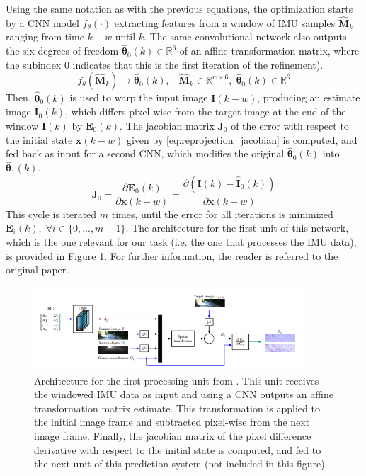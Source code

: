 Using the same notation as with the previous equations, the optimization starts by a CNN model $f_\theta(\cdot)$ extracting features from a window of IMU samples $\mathbf{\hat{M}}_k$ ranging from time $k-w$ until $k$. 
The same convolutional network also outputs the six degrees of freedom $\hat{\boldsymbol{\theta}}_0(k)\!\in\mathbb{R}^6$ of an affine transformation matrix, where the subindex $0$ indicates that this is the first iteration of the refinement).
\begin{equation}
    f_\theta\left(\mathbf{\hat{M}}_{k}\right) \rightarrow \hat{\boldsymbol{\theta}}_0(k), \;\;\; \mathbf{\hat{M}}_{k}\in\mathbb{R}^{w\times6}, \;\hat{\boldsymbol{\theta}}_0(k)\in\mathbb{R}^6
\end{equation}
Then, $\hat{\boldsymbol{\theta}}_0(k)$ is used to warp the input image $\mathbf{I}(k-w)$, producing an estimate image $\mathbf{\hat{I}}_0(k)$, which differs pixel-wise from the target image at the end of the window $\mathbf{I}(k)$ by $\mathbf{E}_0(k)$.
The jacobian matrix $\mathbf{J}_0$ of the error with respect to the initial state $\mathbf{x}(k-w)$ given by \ref{eq:reprojection_jacobian} is computed, and fed back as input for a second CNN, which modifies the original $\hat{\boldsymbol{\theta}}_0(k)$ into $\hat{\boldsymbol{\theta}}_1(k)$.
\begin{equation}\label{eq:reprojection_jacobian}
    \mathbf{J}_0 = \frac{\partial \mathbf{E}_0(k)}{\partial \mathbf{x}(k-w)}=\frac{\partial\!\left( \mathbf{I}(k)-\mathbf{\hat{I}}_0(k)\right)}{\partial \mathbf{x}(k-w)}
\end{equation}
This cycle is iterated $m$ times, until the error for all iterations is minimized $\mathbf{E}_i(k), \;\forall i\in\{0,...,m-1\}$.
The architecture for the first unit of this network, which is the one relevant for our task (i.e. the one that processes the IMU data), is provided in Figure \ref{fig:first_unit_unsupervised_vio}.
For further information, the reader is referred to the original paper. 

\begin{figure}[h]
   \centering
   \includegraphics[width=0.90\textwidth]{thesis_template/img/unsupervised_VIO.png}
   \caption{Architecture for the first processing unit from \cite{DBLP:journals/corr/abs-1803-05850}. This unit receives the windowed IMU data as input and using a CNN outputs an affine transformation matrix estimate. 
   This transformation is applied to the initial image frame and subtracted pixel-wise from the next image frame.
   Finally, the jacobian matrix of the pixel difference derivative with respect to the initial state is computed, and fed to the next unit of this prediction system (not included in this figure).}
   \label{fig:first_unit_unsupervised_vio}
\end{figure}